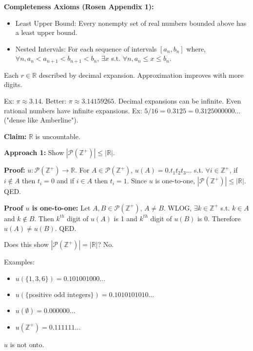 \documentclass[10pt]{article}
\begin{document}
\begin{multicols}{3}
\textbf{Completeness Axioms (Rosen Appendix 1):}
\begin{itemize}
    \item Least Upper Bound: Every nonempty set of real numbers bounded above has a least upper bound.
    \item Nested Intervals:  For each sequence of intervals $[a_n, b_n]$ where, $\forall n, a_n < a_{n+1} < b_{n+1} < b_n$, $\exists x$ s.t. $\forall n, a_n \leq x \leq b_n$.
\end{itemize}

Each $r \in \mathbb{R}$ described by decimal expansion. Approximation improves with more digits.

Ex: $\pi \approx 3.14$. Better: $\pi \approx 3.14159265$.  Decimal expansions can be infinite. Even rational numbers have infinite expansions. Ex: $5/16 = 0.3125 = 0.3125000000...$ ("dense like Amberline").
\hrulefill

\textbf{Claim:} $\mathbb{R}$ is uncountable.

\textbf{Approach 1:} Show $|\mathcal{P}(\mathbb{Z}^+)| \leq |\mathbb{R}|$.

\textbf{Proof:} $u: \mathcal{P}(\mathbb{Z}^+) \to \mathbb{R}$. For $A \in \mathcal{P}(\mathbb{Z}^+)$, $u(A) = 0.t_1t_2t_3...$ s.t. $\forall i \in \mathbb{Z}^+$, if $i \notin A$ then $t_i=0$ and if $i \in A$ then $t_i=1$. Since $u$ is one-to-one, $|\mathcal{P}(\mathbb{Z}^+)| \leq |\mathbb{R}|$. QED.

\textbf{Proof $u$ is one-to-one:} Let $A, B \in \mathcal{P}(\mathbb{Z}^+)$, $A \neq B$. WLOG, $\exists k \in \mathbb{Z}^+$ s.t. $k \in A$ and $k \notin B$. Then $k^{th}$ digit of $u(A)$ is 1 and $k^{th}$ digit of $u(B)$ is 0. Therefore $u(A) \neq u(B)$. QED.

Does this show $|\mathcal{P}(\mathbb{Z}^+)| = |\mathbb{R}|$?  No.

\hrulefill
Examples:
\begin{itemize}
\item
    $u(\{1,3,6\}) = 0.101001000...$
\item
    $u(\{\text{positive odd integers}\}) = 0.1010101010...$
\item
    $u(\emptyset) = 0.000000...$
\item
    $u(\mathbb{Z}^+) = 0.111111...$
\end{itemize}
$u$ is not onto.


\end{multicols}
\end{document}
